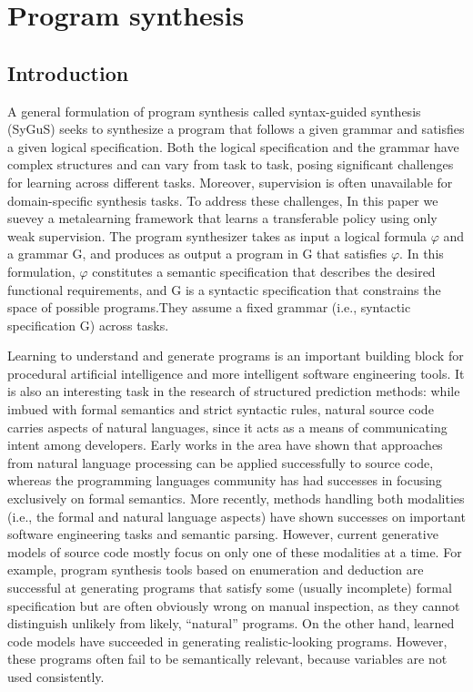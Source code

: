 \documentclass{article}
\begin{document}
\section{Program synthesis}
\subsection{Introduction}
A general formulation of program synthesis called syntax-guided synthesis (SyGuS) seeks to synthesize a program that follows a given grammar and satisfies a given logical specification. Both the logical specification and the grammar have complex structures and can vary from task to task, posing significant challenges for learning across different tasks. Moreover, supervision is often unavailable for domain-specific synthesis tasks. To address these challenges, In this paper we suevey a metalearning framework that learns a transferable policy using only weak supervision. The program synthesizer takes as input a logical formula $\varphi$ and a grammar G, and produces as output a program in G that satisfies $\varphi$. In this formulation, $\varphi$ constitutes a semantic specification that describes the desired functional requirements, and G is a syntactic specification that constrains the space of possible programs.They assume a fixed grammar (i.e., syntactic specification G) across tasks.

Learning to understand and generate programs is an important building block for procedural artificial intelligence and more intelligent software engineering tools. It is also an interesting task in the research of structured prediction methods: while imbued with formal semantics and strict syntactic rules, natural source code carries aspects of natural languages, since it acts as a means of communicating intent among developers. Early works in the area have shown that approaches from natural language processing can be applied successfully to source code, whereas the programming languages community has had successes in focusing exclusively on formal semantics. More recently, methods handling both modalities (i.e., the formal and natural language aspects) have shown successes on important software engineering tasks and semantic parsing. However, current generative models of source code mostly focus on only one of these modalities at a time. For example, program synthesis tools based on enumeration and deduction are successful at generating programs that satisfy some (usually incomplete) formal specification but are often obviously wrong on manual inspection, as they cannot distinguish unlikely from likely, “natural” programs. On the other hand, learned code models have succeeded in generating realistic-looking programs. However, these programs often fail to be semantically relevant, because variables are not used consistently.
\end{document}
